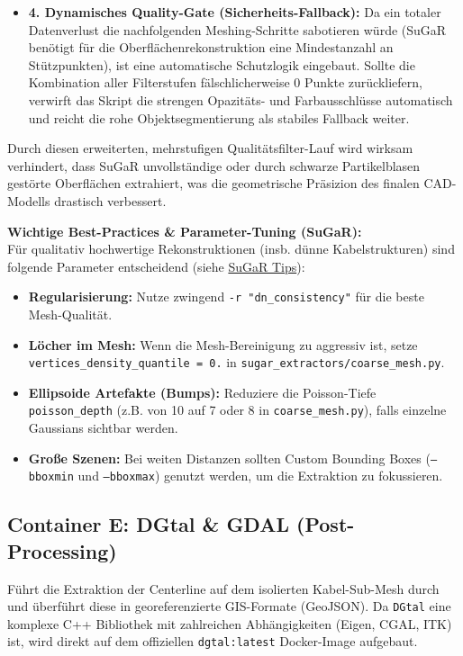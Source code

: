 \documentclass[12pt,a4paper]{article}
\begin{document}
\begin{itemize}[noitemsep]
\[    \]
    Punkte, bei welchen sämtliche Farbkanäle unter einem einstellbaren Schwellenwert (Standard $\le 0.08$) liegen, werden zuverlässig als schwarzer Ruß oder Dunst identifiziert und aus der Geometrie eliminiert.
    \item \textbf{4. Dynamisches Quality-Gate (Sicherheits-Fallback):} Da ein totaler Datenverlust die nachfolgenden Meshing-Schritte sabotieren würde (SuGaR benötigt für die Oberflächenrekonstruktion eine Mindestanzahl an Stützpunkten), ist eine automatische Schutzlogik eingebaut. Sollte die Kombination aller Filterstufen fälschlicherweise $0$ Punkte zurückliefern, verwirft das Skript die strengen Opazitäts- und Farbausschlüsse automatisch und reicht die rohe Objektsegmentierung als stabiles Fallback weiter.
\end{itemize}
Durch diesen erweiterten, mehrstufigen Qualitätsfilter-Lauf wird wirksam verhindert, dass SuGaR unvollständige oder durch schwarze Partikelblasen gestörte Oberflächen extrahiert, was die geometrische Präsizion des finalen CAD-Modells drastisch verbessert.

\textbf{Wichtige Best-Practices \& Parameter-Tuning (SuGaR):}\\
Für qualitativ hochwertige Rekonstruktionen (insb. dünne Kabelstrukturen) sind folgende Parameter entscheidend (siehe \href{https://github.com/Anttwo/SuGaR}{SuGaR Tips}):
\begin{itemize}[noitemsep]
    \item \textbf{Regularisierung:} Nutze zwingend \texttt{-r "dn\_consistency"} für die beste Mesh-Qualität.
    \item \textbf{Löcher im Mesh:} Wenn die Mesh-Bereinigung zu aggressiv ist, setze \texttt{vertices\_density\_quantile = 0.} in \texttt{sugar\_extractors/coarse\_mesh.py}.
    \item \textbf{Ellipsoide Artefakte (Bumps):} Reduziere die Poisson-Tiefe \texttt{poisson\_depth} (z.B. von 10 auf 7 oder 8 in \texttt{coarse\_mesh.py}), falls einzelne Gaussians sichtbar werden.
    \item \textbf{Große Szenen:} Bei weiten Distanzen sollten Custom Bounding Boxes (\texttt{--bboxmin} und \texttt{--bboxmax}) genutzt werden, um die Extraktion zu fokussieren.
\end{itemize}


\subsection*{Container E: DGtal \& GDAL (Post-Processing)}
Führt die Extraktion der Centerline auf dem isolierten Kabel-Sub-Mesh durch und überführt diese in georeferenzierte GIS-Formate (GeoJSON). Da \texttt{DGtal} eine komplexe C++ Bibliothek mit zahlreichen Abhängigkeiten (Eigen, CGAL, ITK) ist, wird direkt auf dem offiziellen \texttt{dgtal:latest} Docker-Image aufgebaut.
\end{document}
